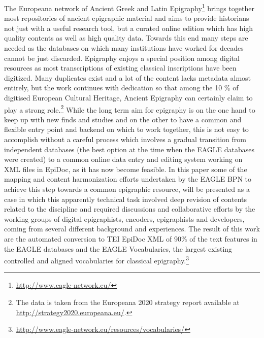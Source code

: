 \documentclass[amsthm,ebook]{saparticle}
\begin{document}
The Europeana network of Ancient Greek and Latin Epigraphy\footnote{\citet{OrlandiCasarosa2014} \citet{Orlandi2014} \citet{liuzzo2014} \url{http://www.eagle-network.eu/}} brings
together most repositories of ancient epigraphic material and aims to
provide historians not just with a useful research tool, but a
curated online edition which has high quality contents as well as high
quality data. Towards this end many steps are needed as the databases on which many institutions have worked for decades cannot be just discarded. Epigraphy enjoys a special position among digital resources as most transcriptions of existing classical inscriptions have been digitized. Many duplicates exist and a lot of the content lacks metadata almost entirely, but the work continues with dedication so that among the 10 \% of digitised European Cultural Heritage, Ancient Epigraphy can certainly claim to play a strong role.\footnote{The data is taken from the Europeana 2020 strategy report available at \url{http://strategy2020.europeana.eu/}.} While the long term aim for epigraphy is on the one hand to keep up with new finds and studies and on the other to have a common and flexible entry point and backend on which to work together, this is not easy to accomplish without a careful process which involves a gradual transition from independent databases (the best option at the time when the EAGLE databases were created) to a common online data entry and editing system working on XML files in EpiDoc, as it has now become feasible.   
In this paper some of the mapping and content harmonization efforts undertaken by the EAGLE BPN to achieve this step towards a common epigraphic resource, will be presented as a case in which this apparently technical task involved deep revision of contents related to the discipline and required discussions and collaborative efforts by the working
groups of digital epigraphists, encoders, epigraphists and developers, coming from several different background and experiences. The result of this work are the automated conversion to TEI EpiDoc XML of 90\% of the text features in the EAGLE databases and the EAGLE Vocabularies, the largest existing controlled and aligned vocabularies for classical epigraphy.\footnote{\url{http://www.eagle-network.eu/resources/vocabularies/}} 
\end{document}
